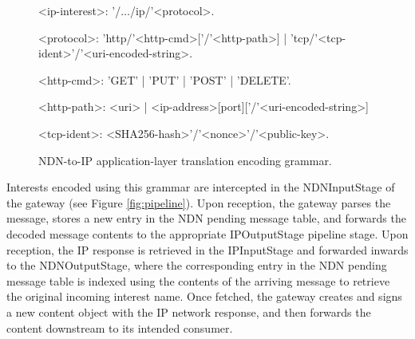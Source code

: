 \begin{figure}
\begin{mdframed}
\begingrammar
\noindent

<ip-interest>:	'/$\dots$/ip/'<protocol>.

<protocol>:	'http/'<http-cmd>[{'/'<http-path>}] | 'tcp/'<tcp-ident>'/'<uri-encoded-string>. 

<http-cmd>: 'GET' | 'PUT' | 'POST' | 'DELETE'.


<http-path>: <uri> | <ip-address>[port]['/'<uri-encoded-string>]

<tcp-ident>: <SHA256-hash>'/'<nonce>'/'<public-key>. %




		
\endgrammar
\end{mdframed}
\caption{NDN-to-IP application-layer translation encoding grammar.}
\end{figure}

Interests encoded using this grammar are intercepted in the NDNInputStage of the gateway (see Figure \ref{fig:pipeline}). Upon reception, the gateway parses the message, stores a new entry in the NDN pending message table, and forwards the decoded message contents to the appropriate IPOutputStage pipeline stage. Upon reception, the IP response is retrieved in the IPInputStage and forwarded inwards to the NDNOutputStage, where the corresponding entry in the NDN pending message table is indexed using the contents of the arriving message to retrieve the original incoming interest name. Once fetched, the gateway creates and signs a new content object with the IP network response, and then forwards the content downstream to its intended consumer. 

